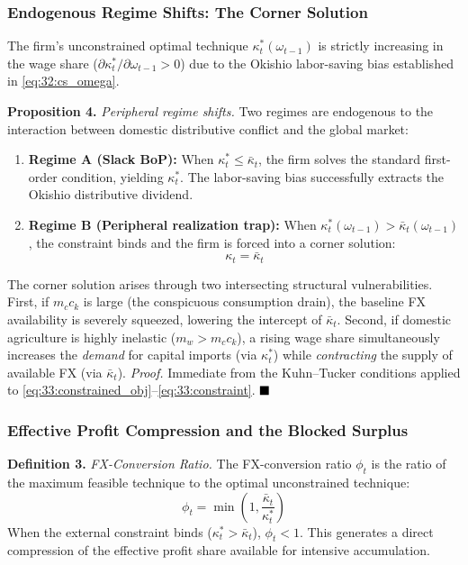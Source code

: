 \subsubsection{Endogenous Regime Shifts: The Corner Solution}

The firm's unconstrained optimal technique
$\kappa_t^*(\omega_{t-1})$ is strictly increasing in the wage
share ($\partial \kappa_t^* / \partial \omega_{t-1} > 0$) due
to the Okishio labor-saving bias established in
\eqref{eq:32:cs_omega}.

\textbf{Proposition 4.} \textit{Peripheral regime shifts.}
Two regimes are endogenous to the interaction between domestic
distributive conflict and the global market:
\begin{enumerate}
	\item \textbf{Regime A (Slack BoP):} When
	$\kappa_t^* \le \bar{\kappa}_t$, the firm solves the
	standard first-order condition, yielding $\kappa_t^*$. The
	labor-saving bias successfully extracts the Okishio
	distributive dividend.
	\item \textbf{Regime B (Peripheral realization trap):} When
	$\kappa_t^*(\omega_{t-1}) > \bar{\kappa}_t(\omega_{t-1})$,
	the constraint binds and the firm is forced into a corner
	solution:
	\begin{equation}
		\kappa_t = \bar{\kappa}_t
		\label{eq:33:corner}
	\end{equation}
\end{enumerate}
The corner solution arises through two intersecting structural
vulnerabilities. First, if $m_c c_k$ is large (the
conspicuous consumption drain), the baseline FX availability
is severely squeezed, lowering the intercept of
$\bar{\kappa}_t$. Second, if domestic agriculture is highly
inelastic ($m_w > m_c c_k$), a rising wage share
simultaneously increases the \textit{demand} for capital
imports (via $\kappa_t^*$) while \textit{contracting} the
supply of available FX (via $\bar{\kappa}_t$).
\textit{Proof.} Immediate from the Kuhn--Tucker conditions
applied to \eqref{eq:33:constrained_obj}--\eqref{eq:33:constraint}.
$\hfill\blacksquare$

\subsubsection{Effective Profit Compression and the Blocked
	Surplus}

\textbf{Definition 3.} \textit{FX-Conversion Ratio.} The
FX-conversion ratio $\phi_t$ is the ratio of the maximum
feasible technique to the optimal unconstrained technique:
\begin{equation}
	\phi_t = \min\left(1, \frac{\bar{\kappa}_t}{\kappa_t^*}\right)
	\label{eq:33:phi}
\end{equation}
When the external constraint binds ($\kappa_t^* > \bar{\kappa}_t$),
$\phi_t < 1$. This generates a direct compression of the
effective profit share available for intensive accumulation.

